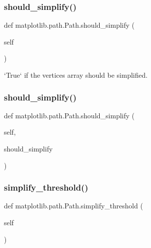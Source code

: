 \subsubsection{\texorpdfstring{should\+\_\+simplify()}{should\_simplify()}\hspace{0.1cm}{\footnotesize\ttfamily [1/2]}}
{\footnotesize\ttfamily def matplotlib.\+path.\+Path.\+should\+\_\+simplify (\begin{DoxyParamCaption}\item[{}]{self }\end{DoxyParamCaption})}

\begin{DoxyVerb}`True` if the vertices array should be simplified.
\end{DoxyVerb}
 \mbox{\label{classmatplotlib_1_1path_1_1Path_a90f9d1a0e75bd36f6e2183d2897a4fab}} 
\subsubsection{\texorpdfstring{should\+\_\+simplify()}{should\_simplify()}\hspace{0.1cm}{\footnotesize\ttfamily [2/2]}}
{\footnotesize\ttfamily def matplotlib.\+path.\+Path.\+should\+\_\+simplify (\begin{DoxyParamCaption}\item[{}]{self,  }\item[{}]{should\+\_\+simplify }\end{DoxyParamCaption})}

\mbox{\label{classmatplotlib_1_1path_1_1Path_a8cd5b4312362adf7f2cf937bdab1c177}} 
\subsubsection{\texorpdfstring{simplify\+\_\+threshold()}{simplify\_threshold()}\hspace{0.1cm}{\footnotesize\ttfamily [1/2]}}
{\footnotesize\ttfamily def matplotlib.\+path.\+Path.\+simplify\+\_\+threshold (\begin{DoxyParamCaption}\item[{}]{self }\end{DoxyParamCaption})}

